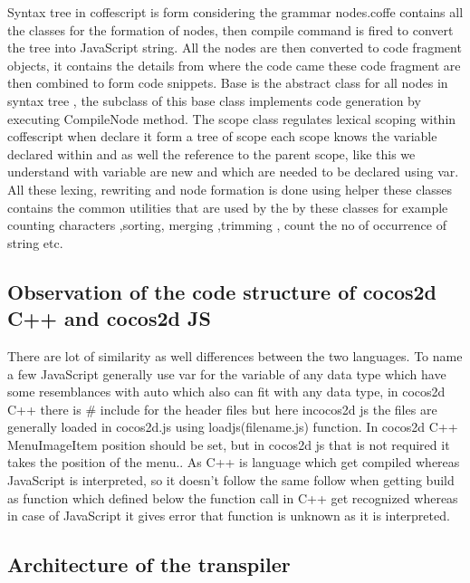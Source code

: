 \documentclass[23pt]{article}
\begin{document}
{Syntax tree in coffescript is form considering the grammar nodes.coffe contains all the classes for the formation of nodes, then compile command is fired to convert the tree into JavaScript string.
All the nodes are then converted to code fragment objects, it contains the details from where the code came these code fragment are then combined to form code snippets. Base is the abstract class for all nodes in syntax tree , the subclass of this base class implements code generation by executing CompileNode method. The scope class regulates lexical scoping within coffescript  when declare it form a tree of scope each scope knows the variable declared within and as well the reference to the parent scope, like this we understand with variable are new and which are needed to be declared using var. All these lexing, rewriting and  node formation is done using helper these classes contains the common utilities that are used by the by these classes for example counting characters ,sorting, merging ,trimming , count the no of occurrence of string etc. \\
\par}

\subsection{Observation of the code structure of cocos2d C++ and cocos2d JS}

{\Large There are lot of similarity as well differences between the two languages. To name a few JavaScript generally use var for the variable of any data type which have some resemblances with auto which also can fit with any data type, in cocos2d C++ there is \# include for the header files but here incocos2d js the files are generally loaded in cocos2d.js using loadjs(filename.js) function. In cocos2d C++ MenuImageItem position should be set, but in cocos2d js that is not required it takes the position of the menu.. As C++ is language which get compiled whereas JavaScript is interpreted, so it doesn’t  follow the same follow when getting build as function which defined below the function call in C++ get recognized whereas in case of JavaScript it gives error that function is unknown as it is interpreted.  \\ \par}

\subsection{Architecture of the transpiler }
\end{document}
